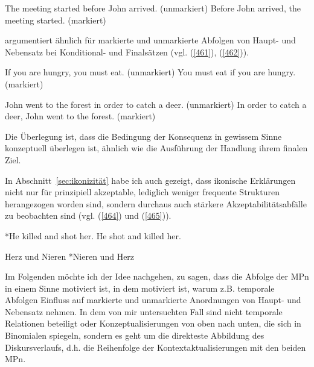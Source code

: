 \begin{exe}
	\ex\label{460}
 		\begin{xlist}
			\ex\label{460a} The meeting started before John arrived. (unmarkiert)
 			\ex\label{460b}	Before John arrived, the meeting started. (markiert)	
 		\hfill\hbox {\citet[400]{Dik1997}}	
 		\end{xlist}				
\end{exe}
\citet{Dik1997} argumentiert ähnlich für markierte und unmarkierte Abfolgen von Haupt- und Nebensatz bei Konditional- und   Finalsätzen (vgl. (\ref{461}), (\ref{462})).

\begin{exe}
	\ex\label{461}
 		\begin{xlist}
			\ex\label{461a} If you are hungry, you must eat. (unmarkiert)
 			\ex\label{461b}	You must eat if you are hungry. (markiert)
 		\end{xlist}			
\end{exe}

\begin{exe}
	\ex\label{462}
 		\begin{xlist}
			\ex\label{462a} John went to the forest in order to catch a deer. (unmarkiert)
 			\ex\label{462b}	In order to catch a deer, John went to the forest. (markiert)	
 		\end{xlist}			
	\hfill\hbox {\citet[400]{Dik1997}}
\end{exe}
Die Überlegung ist, dass die Bedingung der Konsequenz in gewissem Sinne konzep\-tuell überlegen ist, ähnlich wie die Ausführung der Handlung ihrem finalen Ziel.

In Abschnitt~\ref{sec:ikonizität} habe ich auch gezeigt, dass ikonische Erklärungen nicht nur für prinzipiell akzeptable, lediglich weniger frequente Strukturen herangezogen worden sind, sondern durchaus auch stärkere Akzeptabilitätsabfälle zu beobachten sind (vgl. (\ref{464}) und (\ref{465})).

\begin{exe}
	\ex\label{464}
 		\begin{xlist}
			\ex\label{464a} *He killed and shot her.
 			\ex\label{464b}	He shot and killed her.	
 		\hfill\hbox {\citet[92]{Givon1991}}	
 		\end{xlist}				
\end{exe}

\begin{exe}
	\ex\label{465}
 		\begin{xlist}
			\ex\label{465a} Herz und Nieren
 			\ex\label{465b}	*Nieren und Herz
 			\hfill\hbox {\citet[140]{Plank1979}}	
 		\end{xlist}			
\end{exe}
Im Folgenden möchte ich der Idee nachgehen, zu sagen, dass die Abfolge der MPn in einem Sinne motiviert ist, in dem motiviert ist, warum z.B. temporale Abfolgen Einfluss auf markierte und unmarkierte Anordnungen von Haupt- und Nebensatz nehmen. In dem von mir untersuchten Fall sind nicht temporale Relationen beteiligt oder Konzeptualisierungen von oben nach unten, die sich in  Binomialen spiegeln, sondern es geht um die direkteste Abbildung des Diskursverlaufs, d.h. die Reihenfolge der Kontextaktualisierungen mit den beiden MPn.

